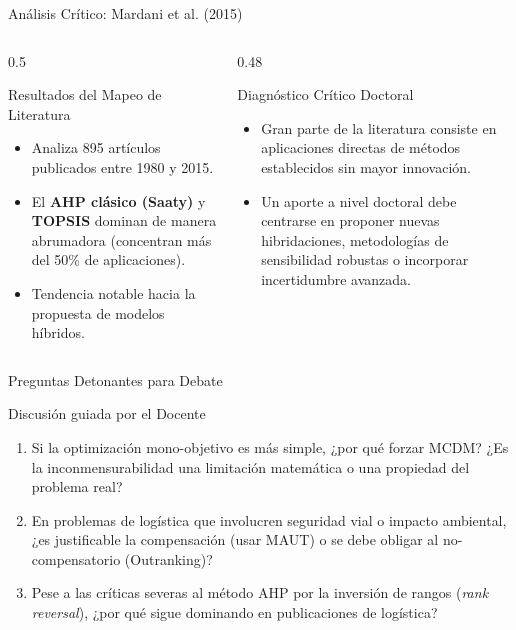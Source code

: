 \documentclass[aspectratio=169, 10pt]{beamer}
\begin{document}
\begin{frame}{Análisis Crítico: Mardani et al. (2015)}
    \begin{columns}
        \begin{column}{0.5\textwidth}
            \begin{block}{Resultados del Mapeo de Literatura}
                \begin{itemize}
                    \item Analiza 895 artículos publicados entre 1980 y 2015.
                    \item El \textbf{AHP clásico (Saaty)} y \textbf{TOPSIS} dominan de manera abrumadora (concentran más del 50\% de aplicaciones).
                    \item Tendencia notable hacia la propuesta de modelos híbridos.
                \end{itemize}
            \end{block}
        \end{column}
        
        \begin{column}{0.48\textwidth}
            \begin{alertblock}{Diagnóstico Crítico Doctoral}
                \begin{itemize}
                    \item Gran parte de la literatura consiste en aplicaciones directas de métodos establecidos sin mayor innovación.
                    \item Un aporte a nivel doctoral debe centrarse en proponer nuevas hibridaciones, metodologías de sensibilidad robustas o incorporar incertidumbre avanzada.
                \end{itemize}
            \end{alertblock}
        \end{column}
    \end{columns}
\end{frame}

\begin{frame}{Preguntas Detonantes para Debate}
    \begin{block}{Discusión guiada por el Docente}
        \begin{enumerate}
            \item Si la optimización mono-objetivo es más simple, ¿por qué forzar MCDM? ¿Es la inconmensurabilidad una limitación matemática o una propiedad del problema real?
            \item En problemas de logística que involucren seguridad vial o impacto ambiental, ¿es justificable la compensación (usar MAUT) o se debe obligar al no-compensatorio (Outranking)?
            \item Pese a las críticas severas al método AHP por la inversión de rangos (\emph{rank reversal}), ¿por qué sigue dominando en publicaciones de logística?
        \end{enumerate}
    \end{block}
\end{frame}
\end{document}
